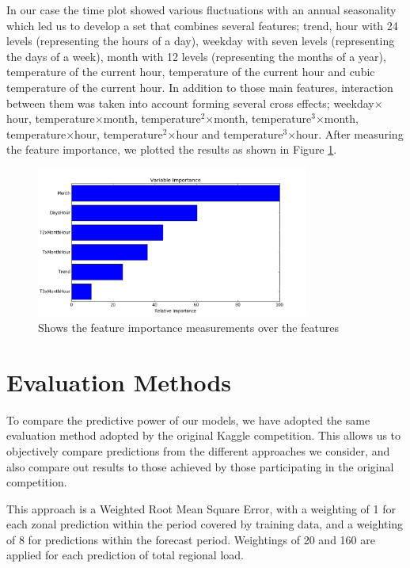 \documentclass{article} %
\begin{document}
In our case the time plot showed various fluctuations with an annual seasonality which led us to develop a set that combines several features; trend, hour with 24 levels (representing the hours of a day), weekday with seven levels (representing the days of a week), month with 12 levels (representing the months of a year), temperature of the current hour, temperature of the current hour and cubic temperature of the current hour. In addition to those main features, interaction between them was taken into account forming several cross effects; weekday$\times$hour, temperature$\times$month, temperature$^2$$\times$month, temperature$^3$$\times$month, temperature$\times$hour, temperature$^2$$\times$hour and temperature$^3$$\times$hour. After measuring the feature importance, we plotted the results as shown in Figure \ref{fig:var_imp}.
\begin{figure}[H]
  \centering
    \includegraphics[width=0.80\textwidth]{variable_importance}
  \caption{Shows the feature importance measurements over the features}
  \label{fig:var_imp}
\end{figure}

\section*{Evaluation Methods}
To compare the predictive power of our models, we have adopted the same evaluation method adopted by the original Kaggle competition.  This allows us to objectively compare predictions from the different approaches we consider, and also compare out results to those achieved by those participating in the original competition.

This approach is a Weighted Root Mean Square Error, with a weighting of 1 for each zonal prediction within the period covered by training data, and a weighting of 8 for predictions within the forecast period.  Weightings of 20 and 160 are applied for each prediction of total regional load.
\end{document}

